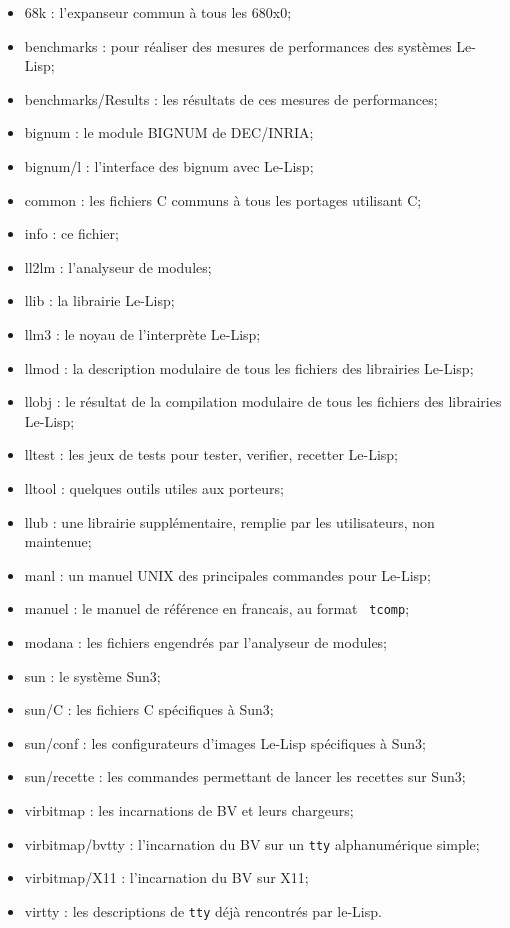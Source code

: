 \begin {itemize}
\item   68k : l'expanseur commun \`{a} tous les 680x0;
\item   benchmarks : pour r\'{e}aliser des mesures de performances des syst\`{e}mes Le-Lisp;
\item   benchmarks/Results : les r\'{e}sultats de ces mesures de performances;
\item   bignum : le module BIGNUM de DEC/INRIA;
\item   bignum/l : l'interface des bignum avec Le-Lisp;
\item   common : les fichiers C communs \`{a} tous les portages utilisant C;
\item   info : ce fichier;
\item   ll2lm : l'analyseur de modules;
\item   llib : la librairie Le-Lisp;
\item   llm3 : le noyau de l'interpr\`{e}te Le-Lisp;
\item   llmod : la description modulaire de tous les fichiers des
librairies Le-Lisp;
\item   llobj : le r\'{e}sultat de la compilation modulaire de tous les
fichiers des librairies Le-Lisp;
\item   lltest : les jeux de tests pour tester, verifier, recetter Le-Lisp;
\item   lltool : quelques outils utiles aux porteurs;
\item   llub : une librairie suppl\'{e}mentaire, remplie par les
utilisateurs, non maintenue;
\item   manl : un manuel UNIX des principales commandes pour Le-Lisp;
\item   manuel : le manuel de r\'{e}f\'{e}rence en francais, au format {\tt
tcomp};
\item   modana : les fichiers engendr\'{e}s par l'analyseur de modules;
\item   sun : le syst\`{e}me Sun3;
\item   sun/C : les fichiers C sp\'{e}cifiques \`{a} Sun3;
\item   sun/conf : les configurateurs d'images Le-Lisp sp\'{e}cifiques \`{a} Sun3;
\item   sun/recette : les commandes permettant de lancer les recettes
sur Sun3;
\item   virbitmap : les incarnations de BV et leurs chargeurs;
\item   virbitmap/bvtty : l'incarnation du BV sur un {\tt tty}
alphanum\'{e}rique simple;
\item   virbitmap/X11 : l'incarnation du BV sur X11;
\item   virtty : les descriptions de {\tt tty} d\'{e}j\`{a} rencontr\'{e}s par
le-Lisp. 
\end {itemize}

